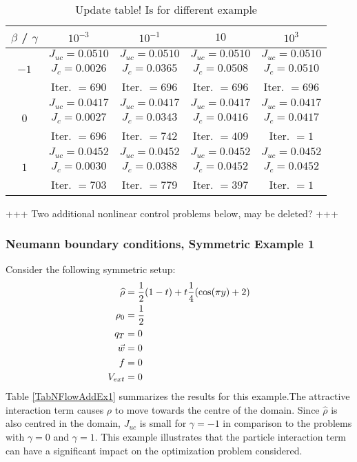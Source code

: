 \begin{table}
	\begin{tabular}{ ||c|| c | c |c | c ||}
		\hline
		$\beta$ / $\gamma$ & $10^{-3}$  & $10^{-1}$  & $10$ & $10^3$ \\ 
		\hline 
		& $J_{uc} = 0.0510$ & $J_{uc} = 0.0510$  & $J_{uc} = 0.0510$ & $J_{uc} = 0.0510$\\ 
		$-1$ & $J_c = 0.0026$ & $J_c = 0.0365$ & $J_c = 0.0508$ & $J_c = 0.0510$\\ 
		& Iter. $= 690$ & Iter. $= 696$  & Iter. $= 696$ & Iter. $= 696$\\ 
		\hline
		& $J_{uc} = 0.0417$ & $J_{uc} = 0.0417$  & $J_{uc} = 0.0417$& $J_{uc} = 0.0417$\\
		$0$  & $J_c = 0.0027$ & $J_c = 0.0343$  & $J_c = 0.0416$ & $J_c = 0.0417$\\ 
		& Iter. $= 696$ & Iter. $= 742$  & Iter. $= 409$ & Iter. $= 1$\\ 
		\hline
		& $J_{uc} = 0.0452$ & $J_{uc} = 0.0452$  & $J_{uc} = 0.0452$ & $J_{uc} = 0.0452$\\
		$1$  & $J_c = 0.0030$ & $J_c = 0.0388$  & $J_c = 0.0452$ & $J_c = 0.0452$\\ 
		& Iter. $= 703$ & Iter. $= 779$  & Iter. $= 397$ & Iter. $= 1$\\ 
		\hline 
	\end{tabular}
	\caption{Update table! Is for different example}
	\label{TabNFlowEx3}
\end{table}

+++ Two additional nonlinear control problems below, may be deleted? +++
\subsubsection{Neumann boundary conditions, Symmetric Example 1}
Consider the following symmetric setup:
\begin{align*}
\widehat \rho &= \frac{1}{2}(1-t) + t\frac{1}{4}(\cos(\pi y)+2)\\
\rho_{0} &= \frac{1}{2}\\
q_{T} &= 0\\
\vec{w} &= 0\\
f &=0\\
V_{ext} &=0
\end{align*}
Table \ref{TabNFlowAddEx1} summarizes the results for this example.The attractive interaction term causes $\rho$ to move towards the centre of the domain. Since $\widehat \rho$ is also centred in the domain, $J_{uc}$ is small for $\gamma =-1$ in comparison to the problems with $\gamma =0$ and $\gamma =1$. This example illustrates that the particle interaction term can have a significant impact on the optimization problem considered. 

